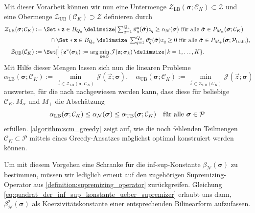 \documentclass[../main.tex]{subfiles}
\begin{document}
Mit dieser Vorarbeit können wir nun eine Untermenge $\mathcal Z_{\mathrm{LB}}(\bm \sigma; \mathcal C_{K}) \subset \mathcal Z$ und eine Obermenge $\mathcal Z_{\mathrm{UB}}(\mathcal C_{K}) \supset \mathcal Z$ definieren durch
\begin{equation}
    \begin{aligned}
        \mathcal Z_{\mathrm{LB}}(\bm \sigma; \mathcal C_{K}) &:=
        \begin{multlined}[t]
        \Set*{\vec{z} \in B_{Q_a} \given
        \textstyle\sum_{q = 1}^{Q_a} \theta_{q}^{a}(\tilde{\bm \sigma})z_{q} \geq \alpha_{\mathcal N}(\bm \sigma)~\fa \tilde{\bm \sigma} \in P_{M_{\alpha}}(\bm \sigma; \mathcal C_{K})
        }
        \\ \cap
        \Set*{\vec{z} \in B_{Q_a} \given
        \textstyle\sum_{q = 1}^{Q_a} \theta_{q}^{a}(\tilde{\bm \sigma}) z_{q} \geq 0~\fa \tilde{\bm \sigma} \in P_{M_{+}}(\bm \sigma; \mathcal P_{\mathrm{train}})
        },
        \end{multlined}\\
        \mathcal Z_{\mathrm{UB}}(\mathcal C_{K}) &:= \Set[\Big]{ \vec{z}^{*}(\bm \sigma_{k}) := \arg \min_{\vec z \in \mathcal Z} \mathcal J(\vec{z}; \bm \sigma_{k}) \given k = 1, \dots, K}.
    \end{aligned}
\end{equation}
Mit Hilfe dieser Mengen lassen sich nun die linearen Probleme
\begin{equation}
    \alpha_{\mathrm{LB}}(\bm \sigma; \mathcal C_{K}) := \min_{\vec{z} \in \mathcal Z_{\mathrm{LB}}(\bm \sigma; \mathcal C_{K})} \mathcal J(\vec{z}; \bm \sigma),
    \quad
    \alpha_{\mathrm{UB}}(\bm \sigma; \mathcal C_{K}) := \min_{\vec{z} \in \mathcal Z_{\mathrm{UB}}(\mathcal C_{K})} \mathcal J(\vec{z}; \bm \sigma)
\end{equation}
auswerten, für die nach \cite[Proposition 1]{Huynh2007} nachgewiesen werden kann, dass diese für beliebige $\mathcal C_{K}, M_{\alpha}$ und $M_{+}$ die Abschätzung
\begin{equation}
    \alpha_{\mathrm{LB}}(\bm \sigma; \mathcal C_{K}) \leq \alpha_{\mathcal N}(\bm \sigma) \leq \alpha_{\mathrm{UB}}(\bm \sigma; \mathcal C_{K}) \quad \fa \bm \sigma \in \mathcal P
\end{equation}
erfüllen.
\cref{algorithm:scm_greedy} zeigt auf, wie die noch fehlenden Teilmengen $\mathcal C_{K} \subset \mathcal P$ mittels eines Greedy-Ansatzes möglichst optimal konstruiert werden können.

Um mit diesem Vorgehen eine Schranke für die inf-sup-Konstante $\beta_{\mathcal N}(\bm \sigma)$ zu bestimmen, müssen wir lediglich erneut auf den zugehörigen Supremizing-Operator aus \cref{definition:supremizing_operator} zurückgreifen.
Gleichung \cref{eq:quadrat_der_inf_sup_konstante_ueber_supremizer} erlaubt uns dann, $\beta_{\mathcal N}^{2}(\bm \sigma)$ als Koerzivitätskonstante einer entsprechenden Bilinearform aufzufassen.
\end{document}

